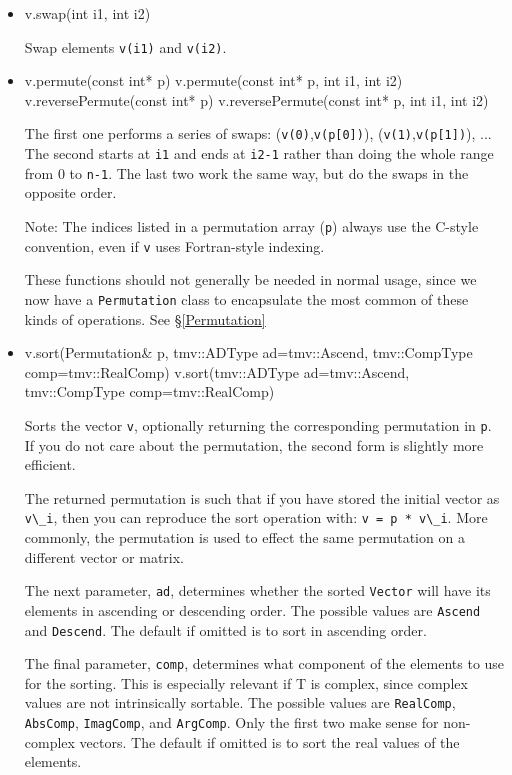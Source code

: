 \documentclass[twoside,letterpaper,11pt]{article}
\renewcommand{\tt}[1]{{\lstinline {#1}}}
\begin{document}
\begin{itemize}
\item
\begin{tmvcode}
v.swap(int i1, int i2)
\end{tmvcode}
Swap elements \tt{v(i1)} and \tt{v(i2)}.

\item
\begin{tmvcode}
v.permute(const int* p)
v.permute(const int* p, int i1, int i2)
v.reversePermute(const int* p)
v.reversePermute(const int* p, int i1, int i2)
\end{tmvcode}
The first one performs a series of swaps: (\tt{v(0)},\tt{v(p[0])}), (\tt{v(1)},\tt{v(p[1])}), ... 
The second starts at \tt{i1} and ends at \tt{i2-1} rather than
doing the whole range from 0 to \tt{n-1}.
The last two work the same way, but do the swaps in the opposite order.

Note: The indices listed in a permutation array (\tt{p}) always use 
the C-style convention, even if \tt{v} uses Fortran-style indexing.

These functions should not generally be needed in normal usage, since we now 
have a \tt{Permutation} class to encapsulate the most common of these kinds of 
operations.  See \S\ref{Permutation}

\item
\begin{tmvcode}
v.sort(Permutation& p, tmv::ADType ad=tmv::Ascend, 
      tmv::CompType comp=tmv::RealComp)
v.sort(tmv::ADType ad=tmv::Ascend, 
      tmv::CompType comp=tmv::RealComp)
\end{tmvcode}
Sorts the vector \tt{v}, optionally returning the corresponding permutation in \tt{p}.
If you do not care about the permutation, the second form is slightly more efficient.

The returned permutation is such that if you have stored the initial vector as
\tt{v\_i}, then you can reproduce the sort operation with: \tt{v = p * v\_i}.
More commonly, the permutation is used to effect the same permutation on a 
different vector or matrix.

The next parameter, \tt{ad}, determines whether the sorted \tt{Vector} 
will have its elements in ascending or descending order.  The possible values
are \tt{Ascend} and \tt{Descend}.  The default if omitted is to sort
in ascending order.

The final parameter, \tt{comp}, determines what component of the
elements to use for the sorting.  This is especially relevant if T is complex, 
since complex values are not intrinsically sortable.
The possible values are
\tt{RealComp}, \tt{AbsComp},
\tt{ImagComp}, and \tt{ArgComp}.
Only the first two make sense for non-complex vectors.  The default if
omitted is to sort the real values of the elements.  


\end{itemize}
\end{document}
